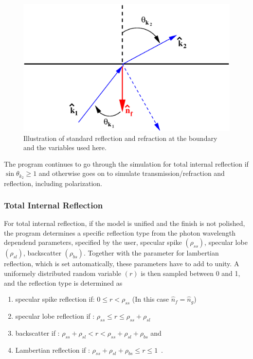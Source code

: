 \begin{figure}[h]
  \hspace{4cm}
  \includegraphics[scale=0.3]{./figures5/OpBoundary03.eps}
  \caption{Illustration of standard reflection and refraction at 
           the boundary and the variables used here.}
           \label{fig:OPBOUND4}
\end{figure}

The program continues to go through the simulation for total internal
reflection if $\sin\theta_{k_2} \geq 1$ and otherwise goes on to
simulate transmission/refraction and reflection, including
polarization.

\subsubsection{Total Internal Reflection}

For total internal reflection, if the model is unified and the finish
is not polished, the program determines a specific reflection type
from the photon wavelength dependend parameters, specified by the
user, specular spike $(\rho_{ss})$, specular lobe $(\rho_{sl})$,
backscatter $(\rho_{bs})$. Together with the parameter for lambertian
reflection, which is set automatically, these parameters have to add
to unity. A uniformely distributed random variable $(r)$ is then
sampled between 0 and 1, and the reflection type is determined as

\begin{enumerate}
  \item{specular spike reflection if: $0 \leq r < \rho_{ss}$ (In this case $\hat{n}_f = \hat{n}_g$)}
  \item{specular lobe reflection if : $\rho_{ss} \leq r \leq \rho_{ss} + \rho_{sl}$}
  \item{backscatter if              : $\rho_{ss} + \rho_{sl} < r < \rho_{ss} + \rho_{sl} + \rho_{bs}$ and}
  \item{Lambertian reflection if    : $ \rho_{ss} + \rho_{sl} + \rho_{bs} \leq r \leq  1$~.}
\end{enumerate}

